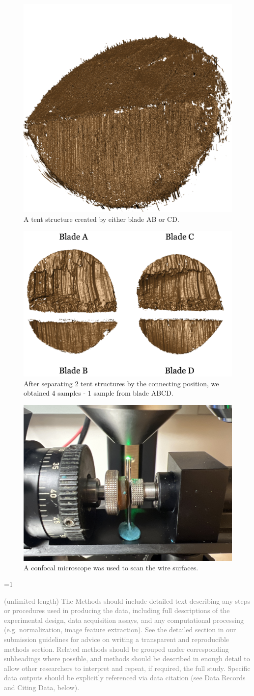 \documentclass[fleqn,10pt]{wlscirep}
\newcommand{\ifinstruction}{1} %
\begin{document}
\begin{figure}[ht]
\centering
\includegraphics[width=0.25\linewidth]{x3p_tent.png}
\caption{A tent structure created by either blade AB or CD.}
\label{fig: x3p_tent}
\end{figure}

\begin{figure}[ht]
\centering
\includegraphics[width=0.5\linewidth]{T1AW-LI-R2-4edges.png}
\caption{After separating 2 tent structures by the connecting position, we obtained 4 samples - 1 sample from blade ABCD.}
\label{fig: T1AW-LI-R2-4edges}
\end{figure}

\begin{figure}[ht]
\centering
\includegraphics[width=0.5\linewidth]{wire-microscope-062524.jpg}
\caption{A confocal microscope was used to scan the wire surfaces.}
\label{fig: wire-microscope-062524}
\end{figure}

\ifnum \ifinstruction=1

\textcolor{gray}{(unlimited length) The Methods should include detailed text describing any steps or procedures used in producing the data, including full descriptions of the experimental design, data acquisition assays, and any computational processing (e.g. normalization, image feature extraction). See the detailed section in our submission guidelines for advice on writing a transparent and reproducible methods section. Related methods should be grouped under corresponding subheadings where possible, and methods should be described in enough detail to allow other researchers to interpret and repeat, if required, the full study. Specific data outputs should be explicitly referenced via data citation (see Data Records and Citing Data, below).}
\end{document}
